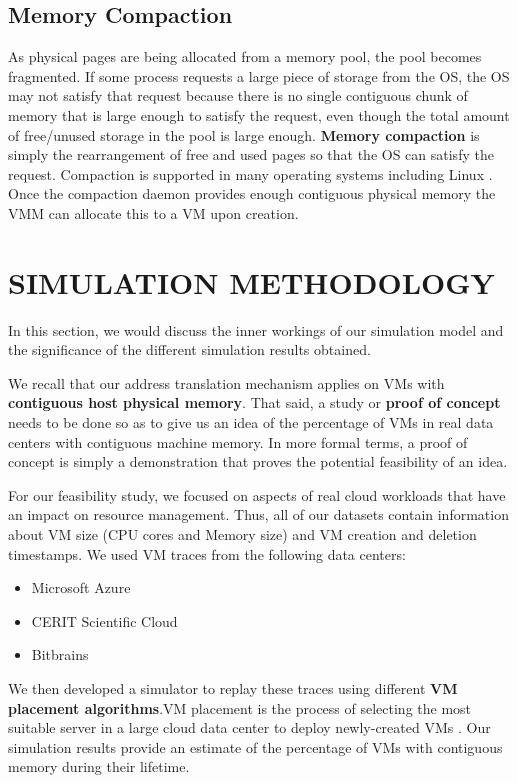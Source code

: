 \documentclass[sigconf]{sigplanconf}
\begin{document}
       \subsection{Memory Compaction}
       As physical pages are being allocated from a memory pool, the pool becomes fragmented. If some process requests a large piece of storage from the OS, the OS may not satisfy that request because there is no single contiguous chunk of memory that is large enough to satisfy the request, even though the total amount of free/unused storage in the pool is large enough. \textbf{Memory compaction} is simply the rearrangement of free and used pages so that the OS can satisfy the request.        
       Compaction is supported in many operating systems including Linux \cite{gandhi7}. Once the compaction daemon provides enough contiguous physical memory the VMM can allocate this to a VM upon creation. 
       
       
      \section{SIMULATION METHODOLOGY}
      In this section, we would discuss the inner workings of our simulation model and the significance of the different simulation results obtained.
            
      We recall that our address translation mechanism applies on VMs with \textbf{contiguous host physical memory}. That said, a study or \textbf{proof of concept} needs to be done so as to give us an idea of the percentage of VMs in real data centers with contiguous machine memory. In more formal terms, a proof of concept is simply a demonstration that proves the potential feasibility of an idea.
      
      For our feasibility study, we focused on aspects of real cloud workloads that have an impact on resource management. Thus, all of our datasets contain information about VM size (CPU cores and Memory size) and VM creation and deletion timestamps. We used VM traces from the following data centers: 
      \begin{itemize}
      	\item Microsoft Azure
      	\item CERIT Scientific Cloud
      	\item Bitbrains
      \end{itemize}
      We then developed a simulator to replay these traces using different \textbf{VM placement algorithms}.VM placement is the process of selecting the most suitable server in a large cloud data center to deploy newly-created VMs \cite{ieeeplacement}. Our simulation results provide an estimate of the percentage of VMs with contiguous memory during their lifetime.
\end{document}
